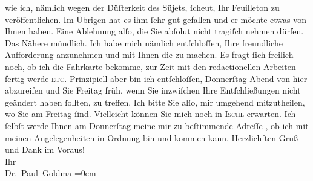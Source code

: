 \begin{ledgroupsized}[t]{13cm}
               wie ich, nämlich wegen der Düſterkeit des Süjets, ſcheut, Ihr Feuilleton zu veröffentlichen. Im Übrigen
               hat es ihm ſehr gut gefallen und er möchte etwas \label{K_L02642-1v}\label{K_L02642-1h} von Ihnen haben. Eine Ablehnung alſo, die Sie abſolut {\pb}nicht tragiſch nehmen dürfen. Das Nähere
               mündlich.\pend
           \pstart
           Ich habe mich nämlich entſchloſſen, Ihre freundliche Aufforderung anzunehmen und mit
               Ihnen die \label{K_L02642-2v}\label{K_L02642-2h} zu machen. Es fragt ſich freilich noch,
               ob ich die Fahrkarte bekomme, zur Zeit mit den redactionellen Arbeiten fertig werde
                  \textsc{etc}. Prinzipiell aber bin ich entſchloſſen, Donnerſtag{ }Abend von hier
               abzureiſen und Sie Freitag{ }früh, wenn Sie inzwiſchen Ihre Entſchließungen nicht geändert haben
               ſollten, \label{K_L02642-4v}\label{K_L02642-4h} zu treffen. Ich
               bitte Sie alſo, mir umgehend mitzutheilen, wo Sie am Freitag ſind. {\pb}Vielleicht können Sie mich
               noch in \textsc{Ischl} erwarten. Ich ſelbſt werde Ihnen am Donnerſtag
               meine mir zu beſtimmende Adreſſe \label{K_L02642-3v}\label{K_L02642-3h}, ob ich mit meinen Angelegenheiten in
               Ordnung bin und kommen kann.\pend
           \pstart
           Herzlichſten Gruß und Dank im Voraus! {\\[\baselineskip]}Ihr {\\[\baselineskip]}\spacefill\mbox{Dr. Paul Goldma{\geminationn}}\pend
           \leftskip=0em{}
         

\end{ledgroupsized}
